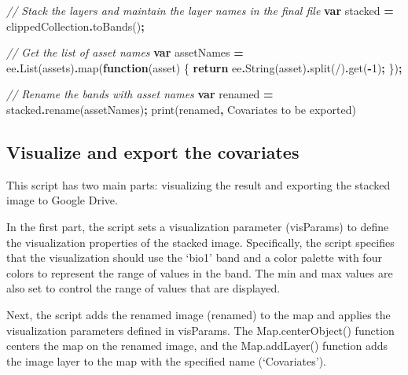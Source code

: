 \documentclass[
  10pt,
  b5paper,
  oneside]{book}
\newenvironment{Shaded}{\begin{snugshade}}{\end{snugshade}}
\newcommand{\CommentTok}[1]{\textcolor[rgb]{0.56,0.35,0.01}{\textit{#1}}}
\newcommand{\ControlFlowTok}[1]{\textcolor[rgb]{0.13,0.29,0.53}{\textbf{#1}}}
\newcommand{\DecValTok}[1]{\textcolor[rgb]{0.00,0.00,0.81}{#1}}
\newcommand{\FunctionTok}[1]{\textcolor[rgb]{0.00,0.00,0.00}{#1}}
\newcommand{\KeywordTok}[1]{\textcolor[rgb]{0.13,0.29,0.53}{\textbf{#1}}}
\newcommand{\NormalTok}[1]{#1}
\newcommand{\OperatorTok}[1]{\textcolor[rgb]{0.81,0.36,0.00}{\textbf{#1}}}
\newcommand{\StringTok}[1]{\textcolor[rgb]{0.31,0.60,0.02}{#1}}
\begin{document}
\begin{Shaded}
\begin{Highlighting}[]
\CommentTok{// Stack the layers and maintain the layer names in the final file}
\KeywordTok{var}\NormalTok{ stacked }\OperatorTok{=}\NormalTok{ clippedCollection}\OperatorTok{.}\FunctionTok{toBands}\NormalTok{()}\OperatorTok{;}

\CommentTok{// Get the list of asset names}
\KeywordTok{var}\NormalTok{ assetNames }\OperatorTok{=}\NormalTok{ ee}\OperatorTok{.}\FunctionTok{List}\NormalTok{(assets)}\OperatorTok{.}\FunctionTok{map}\NormalTok{(}\KeywordTok{function}\NormalTok{(asset) \{}
  \ControlFlowTok{return}\NormalTok{ ee}\OperatorTok{.}\FunctionTok{String}\NormalTok{(asset)}\OperatorTok{.}\FunctionTok{split}\NormalTok{(}\StringTok{\textquotesingle{}/\textquotesingle{}}\NormalTok{)}\OperatorTok{.}\FunctionTok{get}\NormalTok{(}\OperatorTok{{-}}\DecValTok{1}\NormalTok{)}\OperatorTok{;}
\NormalTok{\})}\OperatorTok{;}

\CommentTok{// Rename the bands with asset names}
\KeywordTok{var}\NormalTok{ renamed }\OperatorTok{=}\NormalTok{ stacked}\OperatorTok{.}\FunctionTok{rename}\NormalTok{(assetNames)}\OperatorTok{;}
\FunctionTok{print}\NormalTok{(renamed}\OperatorTok{,} \StringTok{\textquotesingle{}Covariates to be exported\textquotesingle{}}\NormalTok{)}
\end{Highlighting}
\end{Shaded}

\hypertarget{visualize-and-export-the-covariates}{%
\subsection{Visualize and export the covariates}\label{visualize-and-export-the-covariates}}

This script has two main parts: visualizing the result and exporting the stacked image to Google Drive.

In the first part, the script sets a visualization parameter (visParams) to define the visualization properties of the stacked image. Specifically, the script specifies that the visualization should use the `bio1' band and a color palette with four colors to represent the range of values in the band. The min and max values are also set to control the range of values that are displayed.

Next, the script adds the renamed image (renamed) to the map and applies the visualization parameters defined in visParams. The Map.centerObject() function centers the map on the renamed image, and the Map.addLayer() function adds the image layer to the map with the specified name (`Covariates').
\end{document}
